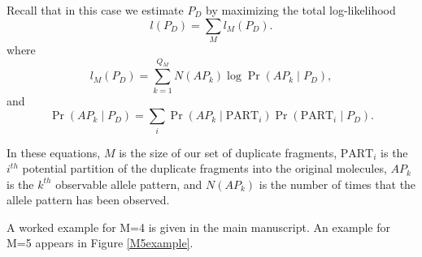 \documentclass{article}
\begin{document}
Recall that in this case we estimate $P_D$ by maximizing the total log-likelihood 
\begin{equation}
l(P_D) = \sum_{M} l_M(P_D) .
\end{equation}
\noindent where
\begin{equation}
l_M(P_D) = \sum_{k=1}^{Q_M} N(AP_k) \log\Pr(AP_k \mid P_D),
\end{equation}
\noindent and
\begin{equation}
\Pr(AP_k \mid P_D) = \sum_{i}\Pr(AP_k \mid \text{PART}_i)\Pr(\text{PART}_i \mid P_D).
\end{equation}

In these equations, $M$ is the size of our set of duplicate fragments, $\text{PART}_i$ is the $i^{th}$ potential partition of the duplicate fragments into the original molecules, $AP_k$ is the $k^{th}$ observable allele pattern, and $N(AP_k)$ is the number of times that the allele pattern has been observed.

A worked example for M=4 is given in the main manuscript. An example for M=5 appears in Figure \ref{M5example}.
\end{document}
